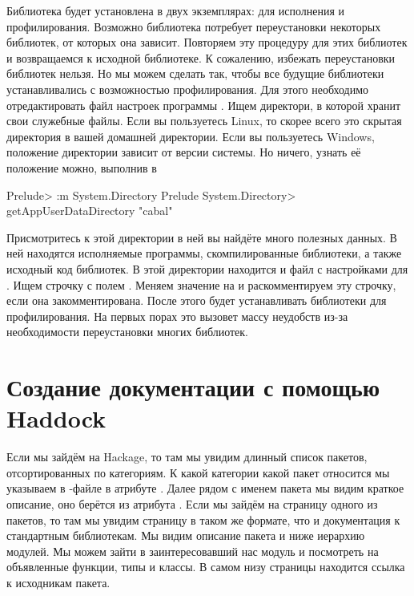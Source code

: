 Библиотека будет установлена в двух экземплярах: для исполнения и
профилирования. Возможно библиотека  потребует переустановки
некоторых библиотек, от которых она зависит. Повторяем эту процедуру для
этих библиотек и возвращаемся к исходной библиотеке. К сожалению,
избежать переустановки библиотек нельзя. Но мы можем сделать так, чтобы
все будущие библиотеки устанавливались с возможностью профилирования.
Для этого необходимо отредактировать файл настроек программы .
Ищем директори, в которой  хранит свои служебные файлы. Если
вы пользуетесь Linux, то скорее всего это скрытая директория 
в вашей домашней директории. Если вы пользуетесь Windows, положение
директории зависит от версии системы. Но ничего, узнать её положение
можно, выполнив в 


\begin{code}
Prelude> :m System.Directory
Prelude System.Directory> getAppUserDataDirectory "cabal"
\end{code}

Присмотритесь к этой директории в ней вы найдёте много полезных данных.
В ней находятся исполняемые программы, скомпилированные библиотеки, а
также исходный код библиотек. В этой директории находится и файл
 с настройками для . Ищем строчку с полем
. Меняем значение на  и
раскомментируем эту строчку, если она закомментирована. После этого
 будет устанавливать библиотеки для профилирования. На
первых порах это вызовет массу неудобств из-за необходимости
переустановки многих библиотек.

\section{Создание документации с помощью Haddock}

Если мы зайдём на Hackage, то там мы увидим длинный список пакетов,
отсортированных по категориям. К какой категории какой пакет относится
мы указываем в -файле в атрибуте . Далее рядом с
именем пакета мы видим краткое описание, оно берётся из атрибута
. Если мы зайдём на страницу одного из пакетов, то там мы
увидим страницу в таком же формате, что и документация к стандартным
библиотекам. Мы видим описание пакета и ниже иерархию модулей. Мы можем
зайти в заинтересовавший нас модуль и посмотреть на объявленные функции,
типы и классы. В самом низу страницы находится ссылка к исходникам
пакета.

